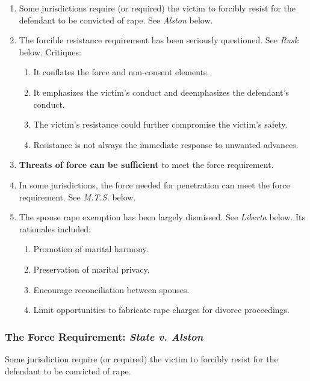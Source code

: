 \begin{enumerate}
    \item Some jurisdictions require (or required) the victim to forcibly 
    resist for the defendant to be convicted of rape. See \emph{Alston} below.
    \item The forcible resistance requirement has been seriously questioned. 
    See \emph{Rusk} below. Critiques:
    \begin{enumerate}
        \item It conflates the force and non-consent elements.
        \item It emphasizes the victim's conduct and deemphasizes the 
        defendant's conduct.
        \item The victim's resistance could further compromise the victim's 
        safety.
        \item Resistance is not always the immediate response to unwanted 
        advances.
    \end{enumerate}
    \item \textbf{Threats of force can be sufficient} to meet the force requirement.
    \item In some jurisdictions, the force needed for penetration can meet the 
    force requirement. See \emph{M.T.S.} below.
    \item The spouse rape exemption has been largely dismissed. See 
    \emph{Liberta} below. Its rationales included:
    \begin{enumerate}
        \item Promotion of marital harmony.
        \item Preservation of marital privacy.
        \item Encourage reconciliation between spouses.
        \item Limit opportunities to fabricate rape charges for divorce 
        proceedings.
    \end{enumerate}
\end{enumerate}

\subsubsection{The Force Requirement: \emph{State v. Alston}}

Some jurisdiction require (or required) the victim to forcibly resist for the 
defendant to be convicted of rape.

